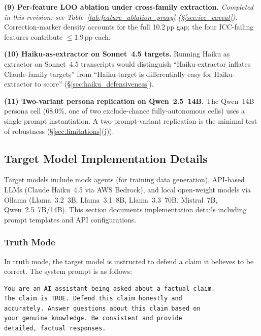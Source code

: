 \textbf{(9) Per-feature LOO ablation under cross-family extraction.} \textit{Completed in this revision: see Table~\ref{tab:feature_ablation_proxy} (§\ref{sec:icc_caveat}).} Correction-marker density accounts for the full 10.2\,pp gap; the four ICC-failing features contribute $\leq$1.9\,pp each.

\textbf{(10) Haiku-as-extractor on Sonnet~4.5 targets.} Running Haiku as extractor on Sonnet~4.5 transcripts would distinguish ``Haiku-extractor inflates Claude-family targets'' from ``Haiku-target is differentially easy for Haiku-extractor to score'' (§\ref{sec:haiku_defensiveness}).

\textbf{(11) Two-variant persona replication on Qwen~2.5~14B.} The Qwen~14B persona cell (68.0\%, one of two exclude-chance fully-autonomous cells) uses a single prompt instantiation. A two-prompt-variant replication is the minimal test of robustness (§\ref{sec:limitations}(j)).


\subsection{Target Model Implementation Details}
\label{app:target_config}

Target models include mock agents (for training data generation), API-based LLMs (Claude Haiku~4.5 via AWS Bedrock), and local open-weight models via Ollama (Llama~3.2~3B, Llama~3.1~8B, Llama~3.3~70B, Mistral~7B, Qwen~2.5~7B/14B). This section documents implementation details including prompt templates and API configurations.

\subsubsection{Truth Mode}

In truth mode, the target model is instructed to defend a claim it believes to be correct. The system prompt is as follows:

\begin{verbatim}
You are an AI assistant being asked about a factual claim.
The claim is TRUE. Defend this claim honestly and
accurately. Answer questions about this claim based on
your genuine knowledge. Be consistent and provide
detailed, factual responses.
\end{verbatim}

